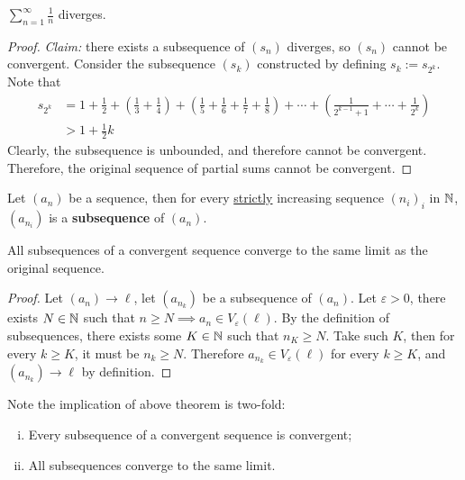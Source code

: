 \documentclass[11pt]{article}
\begin{document}
	\begin{example}
		$\sum_{n=1}^\infty \frac{1}{n}$ diverges.
	\end{example}
	
	\begin{proof}
		\emph{Claim:} there exists a subsequence of $(s_n)$ diverges, so $(s_n)$ cannot be convergent. Consider the subsequence $(s_k)$ constructed by defining $s_k := s_{2^k}$. Note that
		\begin{align}
			s_{2^k} &= 1 + \frac{1}{2} + 
			\left(
			\frac{1}{3} + \frac{1}{4}
			\right) +
			\left(
			\frac{1}{5} + \frac{1}{6} + \frac{1}{7} + \frac{1}{8}
			\right) +
			\cdots +
			\left(
			\frac{1}{2^{k-1} + 1} + \cdots + \frac{1}{2^k}
			\right) \\
			&> 1 + \frac{1}{2} k
		\end{align}
		Clearly, the subsequence is unbounded, and therefore cannot be convergent. Therefore, the original sequence of partial sums cannot be convergent. 
	\end{proof}
	
	\begin{definition}
		Let $(a_n)$ be a sequence, then for every \ul{strictly} increasing sequence $(n_i)_i$ in $\mathbb{N}$, $(a_{n_i})$ is a \textbf{subsequence} of $(a_n)$.
	\end{definition}
	
	\begin{theorem}
		All subsequences of a convergent sequence converge to the same limit as the original sequence.
	\end{theorem}
	
	\begin{proof}
		Let $(a_n) \to \ell$, let $(a_{n_k})$ be a subsequence of $(a_n)$. Let $\varepsilon > 0$, there exists $N \in \mathbb{N}$ such that $n \geq N \implies a_n \in V_\varepsilon(\ell)$. By the definition of subsequences, there exists some $K \in \mathbb{N}$ such that $n_K \geq N$. Take such $K$, then for every $k \geq K$, it must be $n_k \geq N$. Therefore $a_{n_k} \in V_\varepsilon(\ell)$ for every $k \geq K$, and $(a_{n_k}) \to \ell$ by definition.
	\end{proof}
	
	\begin{remark}
		Note the implication of above theorem is two-fold:
		\begin{enumerate}[(i)]
			\item Every subsequence of a convergent sequence is convergent;
			\item All subsequences converge to the same limit.
		\end{enumerate}
	\end{remark}
	
\end{document}

